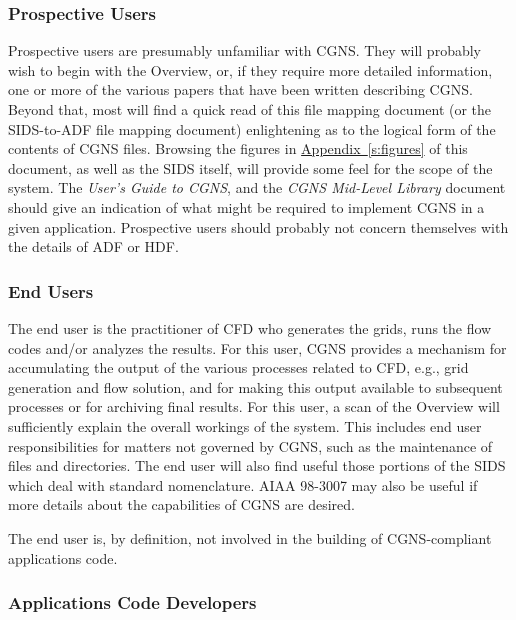 \subsubsection{Prospective Users}

Prospective users are presumably unfamiliar with CGNS. They will
probably wish to begin with the Overview, or, if they require more
detailed information, one or more of the various papers that have been
written describing CGNS.
Beyond that, most will find a quick read of this file mapping document
(or the SIDS-to-ADF file mapping document) enlightening as to the
logical form of the contents of CGNS files.
Browsing the figures in
\hyperref[s:figures]{Appendix~\ref*{s:figures}}
of this document, as well as the SIDS itself, will provide some feel
for the scope of the system.
The \textit{User's Guide to CGNS}, and the \textit{CGNS Mid-Level
Library} document should give an indication of what might be required to
implement CGNS in a given application.
Prospective users should probably not concern themselves with the
details of ADF or HDF.

\subsubsection{End Users}

The end user is the practitioner of CFD who generates the grids,
runs the flow codes and/or analyzes the results. For this user, CGNS
provides a mechanism for accumulating the output of the various
processes related to CFD, e.g., grid generation and flow solution,
and for making this output available to subsequent processes or for
archiving final results. For this user, a scan of the Overview will
sufficiently explain the overall workings of the system. This includes
end user responsibilities for matters not governed by CGNS, such as the
maintenance of files and directories. The end user will also find useful
those portions of the SIDS which deal with standard nomenclature. AIAA
98-3007 may also be useful if more details about the capabilities of
CGNS are desired.

The end user is, by definition, not involved in the building of
CGNS-compliant applications code.

\subsubsection{Applications Code Developers}

